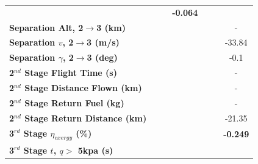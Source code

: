 \begin{table}[ht]
\begin{tabular}{l c c c c c c}
		& \textbf{\secondExergyEffvCdOneHundredSeven}
		& \textbf{\secondExergyEffvCdOneHundredFifteen}
		& \textbf{-0.064}
		\\
		\textbf{Separation Alt, 2$\rightarrow$3 (km)}
		& \secondthirdSeparationAltvCdTwenty
		& \secondthirdSeparationAltvCdFifty
		& \secondthirdSeparationAltvCdStandard
		& \secondthirdSeparationAltvCdOneHundredSeven
		& \secondthirdSeparationAltvCdOneHundredFifteen
		& -
		\\
		\textbf{Separation $v$, 2$\rightarrow$3 (m/s)}
		& \secondthirdSeparationvvCdTwenty
		& \secondthirdSeparationvvCdFifty
		& \secondthirdSeparationvvCdStandard
		& \secondthirdSeparationvvCdOneHundredSeven
		& \secondthirdSeparationvvCdOneHundredFifteen
		&-33.84
		\\
		\textbf{Separation $\gamma$, 2$\rightarrow$3 (deg)}
		& \secondthirdSeparationgammavCdTwenty
		& \secondthirdSeparationgammavCdFifty
		& \secondthirdSeparationgammavCdStandard
		& \secondthirdSeparationgammavCdOneHundredSeven
		& \secondthirdSeparationgammavCdOneHundredFifteen
		&-0.1
		\\
		\textbf{2$^{nd}$ Stage Flight Time (s)}
		& \secondFlightTimevCdTwenty
		& \secondFlightTimevCdFifty
		& \secondFlightTimevCdStandard
		& \secondFlightTimevCdOneHundredSeven
		& \secondFlightTimevCdOneHundredFifteen
		& -
		\\
		\textbf{2$^{nd}$ Stage Distance Flown (km)}
		& \SecondDistvCdTwenty
		& \SecondDistvCdFifty
		& \SecondDistvCdStandard
		& \SecondDistvCdOneHundredSeven
		& \SecondDistvCdOneHundredFifteen
		& -
		\\
		\textbf{2$^{nd}$ Stage Return Fuel (kg)}
		& \returnFuelvCdTwenty
		& \returnFuelvCdFifty
		& \returnFuelvCdStandard
		& \returnFuelvCdOneHundredSeven
		& \returnFuelvCdOneHundredFifteen
		& -
		\\
		\textbf{2$^{nd}$ Stage Return Distance (km)}
		& \returnDistvCdTwenty
		& \returnDistvCdFifty
		& \returnDistvCdStandard
		& \returnDistvCdOneHundredSeven
		& \returnDistvCdOneHundredFifteen
		&-21.35
		\\
		\hline 
		\textbf{3$^{rd}$ Stage $\eta_{exergy}$ (\%)}
		& \textbf{\thirddExergyEffvCdTwenty}
		& \textbf{\thirddExergyEffvCdFifty}
		& \textbf{\thirddExergyEffvCdStandard}
		& \textbf{\thirddExergyEffvCdOneHundredSeven}
		& \textbf{\thirddExergyEffvCdOneHundredFifteen}
		& \textbf{-0.249}
		\\
		\textbf{3$^{rd}$ Stage $t$, $q >$ 5kpa (s)}
		& \thirdqOverFivevCdTwenty
		& \thirdqOverFivevCdFifty
		& \thirdqOverFivevCdStandard
		& \thirdqOverFivevCdOneHundredSeven

\end{tabular}
\end{table}
